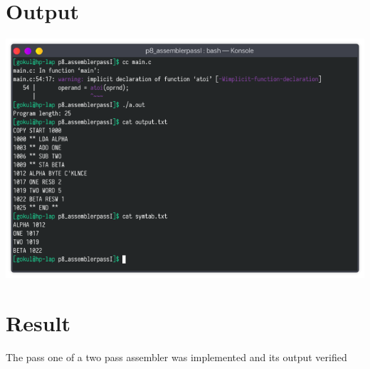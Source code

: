 \documentclass[13pt,oneside]{book}
\begin{document}
\section*{Output}
\includegraphics[width=\textwidth]{img/p8.png}
    
\Large
\section*{Result}
\large
The pass one of a two pass assembler was implemented and its output verified
\end{document}
